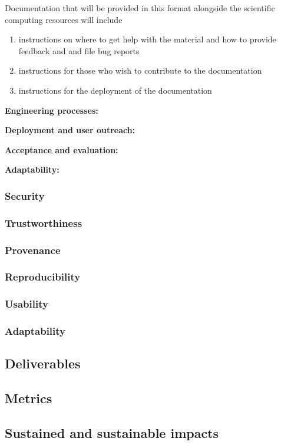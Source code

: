 Documentation that will be provided in this format alongside the scientific computing resources will include

\begin{enumerate}
    \item instructions on where to get help with the material and how to provide feedback and and file bug reports
    \item instructions for those who wish to contribute to the documentation
    \item instructions for the deployment of the documentation
\end{enumerate}


\textbf{Engineering processes:}


\textbf{Deployment and user outreach:}

\textbf{Acceptance and evaluation:}

\textbf{Adaptability:}



\subsubsection{Security}

\subsubsection{Trustworthiness}

\subsubsection{Provenance}

\subsubsection{Reproducibility}

\subsubsection{Usability}

\subsubsection{Adaptability}

\subsection{Deliverables}


\subsection{Metrics}


\subsection{Sustained and sustainable impacts}